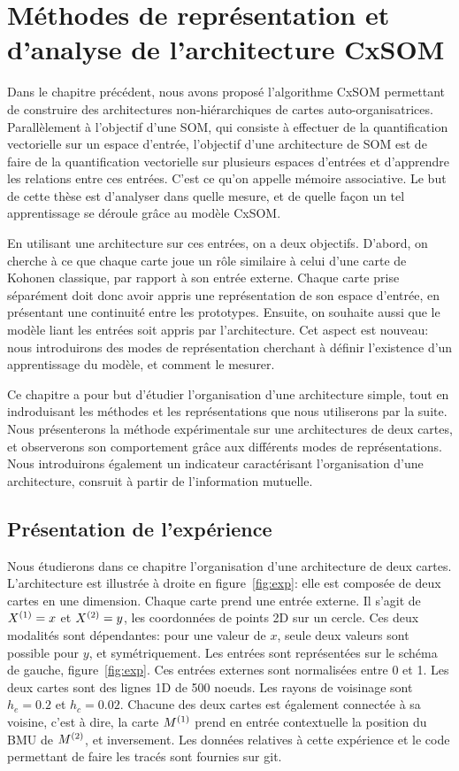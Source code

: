 \chapter{Méthodes de représentation et d'analyse de l'architecture CxSOM}
\graphicspath{{03-Representation/}}
\minitoc

Dans le chapitre précédent, nous avons proposé l'algorithme CxSOM permettant de construire des architectures non-hiérarchiques de cartes auto-organisatrices.
Parallèlement à l'objectif d'une SOM, qui consiste à effectuer de la quantification vectorielle sur un espace d'entrée, l'objectif d'une architecture de SOM est de faire de la quantification vectorielle sur plusieurs espaces d'entrées et d'apprendre les relations entre ces entrées.
C'est ce qu'on appelle mémoire associative. Le but de cette thèse est d'analyser dans quelle mesure, et de quelle façon un tel apprentissage se déroule grâce au modèle CxSOM.

En utilisant une architecture sur ces entrées, on a deux objectifs. D'abord, on cherche à ce que chaque carte joue un rôle similaire à celui d'une carte de Kohonen classique, par rapport à son entrée externe.
Chaque carte prise séparément doit donc avoir appris une représentation de son espace d'entrée, en présentant une continuité entre les prototypes.
Ensuite, on souhaite aussi que le modèle liant les entrées soit appris par l'architecture. Cet aspect est nouveau:
nous introduirons des modes de représentation cherchant à définir l'existence d'un apprentissage du modèle, et comment le mesurer.

Ce chapitre a pour but d'étudier l'organisation d'une architecture simple, tout en indroduisant les méthodes et les représentations que nous utiliserons par la suite.
Nous présenterons la méthode expérimentale sur une architectures de deux cartes, et observerons son comportement grâce aux différents modes de représentations.
Nous introduirons également un indicateur caractérisant l'organisation d'une architecture, consruit à partir de l'information mutuelle.

\section{Présentation de l'expérience}

Nous étudierons dans ce chapitre l'organisation d'une architecture de deux cartes. L'architecture est illustrée à droite en figure~\ref{fig:exp}: elle est composée de deux cartes en une dimension. Chaque carte prend une entrée externe. Il s'agit de $X^{({1})}=x$ et $X^{({2})}=y$, les coordonnées de points 2D sur un cercle. Ces deux modalités sont dépendantes: pour une valeur de $x$, seule deux valeurs sont possible pour $y$, et symétriquement. Les entrées sont représentées sur le schéma de gauche, figure~\ref{fig:exp}.
Ces entrées externes sont normalisées entre 0 et 1. Les deux cartes sont des lignes 1D de 500 noeuds. Les rayons de voisinage sont $h_e = 0.2$ et $h_c = 0.02$.
Chacune des deux cartes est également connectée à sa voisine, c'est à dire, la carte $M^{({1})}$ prend en entrée contextuelle la position du BMU de $M^{({2})}$, et inversement.
Les données relatives à cette expérience et le code permettant de faire les tracés sont fournies sur git.


